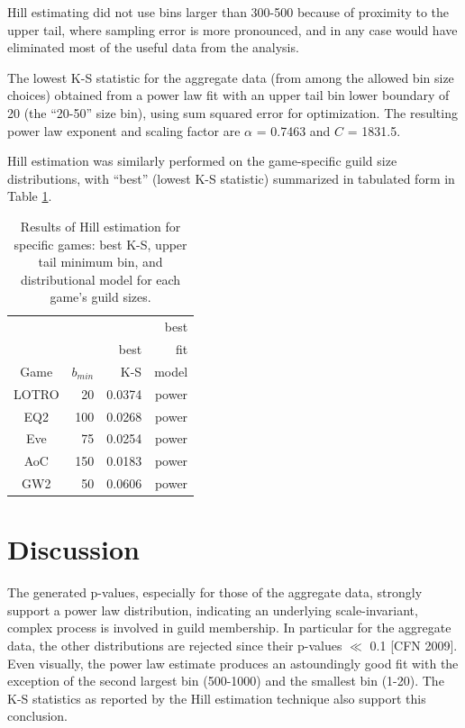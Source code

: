 \documentclass[pdftex,12pt]{llncs}
\begin{document}
Hill estimating did not use bins larger than 300-500 because of proximity to the upper tail, where sampling error is more pronounced, and in any case would have eliminated most of the useful data from the analysis.

The lowest K-S statistic for the aggregate data (from among the allowed bin size choices) obtained from a power law fit with an upper tail bin lower boundary of 20 (the “20-50” size bin), using sum squared error for optimization.  The resulting power law exponent and scaling factor are $\alpha$ = 0.7463 and $C$ = 1831.5.

Hill estimation was similarly performed on the game-specific guild size distributions, with “best” (lowest K-S statistic) summarized in tabulated form in Table \ref{hillestimateresults}.

\begin{table}
	\centering
	\caption{Results of Hill estimation for specific games: best K-S, upper tail minimum bin, and distributional model for each game's guild sizes.}
	\begin{tabular}{|c r r r|}
		\hline
		 & & & best \\
		 & & best & fit \\
		Game & $b_{min}$ & K-S & \hspace{8pt} model \\ 
		\hline
		LOTRO & 20 & \hspace{8pt} 0.0374 & power \\
		\hline
		EQ2 & 100 & \hspace{8pt} 0.0268 & power \\
		\hline
		Eve & 75 & \hspace{8pt} 0.0254 & power \\
		\hline
		AoC & 150 & \hspace{8pt} 0.0183 & power \\
		\hline
		GW2 & 50 & \hspace{8pt} 0.0606 & power \\
		\hline
	\end{tabular}
	\label{hillestimateresults}
\end{table}

\section{Discussion}
The generated p-values, especially for those of the aggregate data, strongly support a power law distribution, indicating an underlying scale-invariant, complex process is involved in guild membership.
In particular for the aggregate data, the other distributions are rejected since their p-values $\ll$ 0.1 [CFN 2009].
Even visually, the power law estimate produces an astoundingly good fit with the exception of the second largest bin (500-1000) and the smallest bin (1-20).
The K-S statistics as reported by the Hill estimation technique also support this conclusion.
\end{document}
